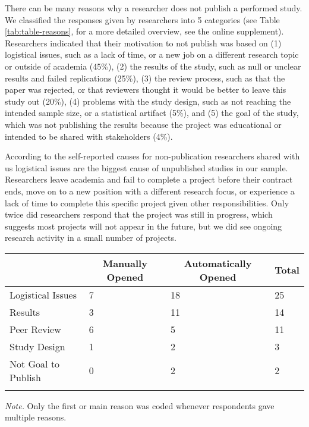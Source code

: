 \documentclass[
  ,jou, a4paper,floatsintext]{apa6}
\begin{document}
There can be many reasons why a researcher does not publish a performed study. We classified the responses given by researchers into 5 categories (see Table \ref{tab:table-reasons}, for a more detailed overview, see the online supplement). Researchers indicated that their motivation to not publish was based on (1) logistical issues, such as a lack of time, or a new job on a different research topic or outside of academia (45\%), (2) the results of the study, such as null or unclear results and failed replications (25\%), (3) the review process, such as that the paper was rejected, or that reviewers thought it would be better to leave this study out (20\%), (4) problems with the study design, such as not reaching the intended sample size, or a statistical artifact (5\%), and (5) the goal of the study, which was not publishing the results because the project was educational or intended to be shared with stakeholders (4\%).

According to the self-reported causes for non-publication researchers shared with us logistical issues are the biggest cause of unpublished studies in our sample. Researchers leave academia and fail to complete a project before their contract ends, move on to a new position with a different research focus, or experience a lack of time to complete this specific project given other responsibilities. Only twice did researchers respond that the project was still in progress, which suggests most projects will not appear in the future, but we did see ongoing research activity in a small number of projects.

\begin{table*}[tbp]

\begin{center}
\begin{threeparttable}

\caption{\label{tab:table-reasons}Summary of main reasons researchers self-reported to not publish registered studies.}

\begin{tabular}{llll}
\toprule
 & \multicolumn{1}{c}{Manually Opened} & \multicolumn{1}{c}{Automatically Opened} & \multicolumn{1}{c}{Total}\\
\midrule
Logistical Issues & 7 & 18 & 25\\
Results & 3 & 11 & 14\\
Peer Review & 6 & 5 & 11\\
Study Design & 1 & 2 & 3\\
Not Goal to Publish & 0 & 2 & 2\\
\bottomrule
\addlinespace
\end{tabular}

\begin{tablenotes}[para]
\normalsize{\textit{Note.} Only the first or main reason was coded whenever respondents gave multiple reasons.}
\end{tablenotes}

\end{threeparttable}
\end{center}

\end{table*}
\end{document}
